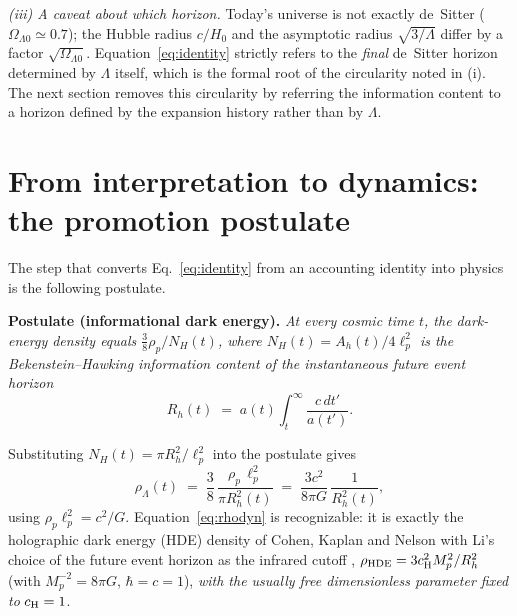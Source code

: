 \documentclass[11pt,a4paper]{article}
\begin{document}
\emph{(iii) A caveat about which horizon.} Today's universe is not exactly
de~Sitter ($\Omega_{\Lambda 0}\simeq 0.7$); the Hubble radius $c/H_0$ and
the asymptotic radius $\sqrt{3/\Lambda}$ differ by a factor
$\sqrt{\Omega_{\Lambda 0}}$. Equation~\eqref{eq:identity} strictly refers to
the \emph{final} de~Sitter horizon determined by $\Lambda$ itself, which is
the formal root of the circularity noted in (i). The next section removes
this circularity by referring the information content to a horizon defined by
the expansion history rather than by $\Lambda$.

\section{From interpretation to dynamics: the promotion postulate}
\label{sec:promotion}

The step that converts Eq.~\eqref{eq:identity} from an accounting identity
into physics is the following postulate.

\medskip
\noindent\textbf{Postulate (informational dark energy).}
\emph{At every cosmic time $t$, the dark-energy density equals
$\tfrac{3}{8}\rho_p/N_H(t)$, where $N_H(t)=A_h(t)/4\ell_p^2$ is the
Bekenstein--Hawking information content of the instantaneous future event
horizon}
\begin{equation}
R_h(t) \;=\; a(t)\int_t^{\infty}\frac{c\,dt'}{a(t')} .
\label{eq:Rh}
\end{equation}

\medskip
\noindent
Substituting $N_H(t)=\pi R_h^2/\ell_p^2$ into the postulate gives
\begin{equation}
\rho_\Lambda(t) \;=\; \frac{3}{8}\,\frac{\rho_p\,\ell_p^2}{\pi R_h^2(t)}
\;=\; \frac{3c^2}{8\pi G}\,\frac{1}{R_h^2(t)},
\label{eq:rhodyn}
\end{equation}
using $\rho_p\ell_p^2 = c^2/G$. Equation~\eqref{eq:rhodyn} is recognizable:
it is exactly the holographic dark energy (HDE) density of Cohen, Kaplan and
Nelson \citep{CKN1999} with Li's choice of the future event horizon as the
infrared cutoff \citep{Li2004},
$\rho_{\rm HDE} = 3c_{\rm H}^2 M_p^2/R_h^2$
(with $M_p^{-2}=8\pi G$, $\hbar=c=1$), \emph{with the usually free
dimensionless parameter fixed to} $c_{\rm H}=1$.
\end{document}
